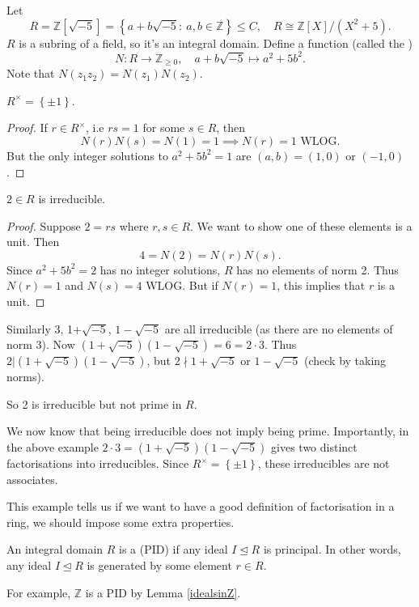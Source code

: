 \documentclass[egregdoesnotlikesansseriftitles,a4paper]{scrartcl}
\begin{document}
\begin{example}\label{Z5i not UFD}
       Let \[
            R=\mathbb{Z}[\sqrt{-5}]= \left\{a+b\sqrt{-5} : \ a,b \in \mathbb{Z}\right\} \leq C, \quad R \cong \mathbb{Z}[X]/(X^2+5)
       .\] $R$ is a subring of a field, so it's an integral domain. Define a function (called the ) \[
       N: R \rightarrow \mathbb{Z}_{\geq 0}, \quad a+b \sqrt{-5} \mapsto a^2+5b^2
       .\] Note that $N (z_1 z_2 )=N (z_1 )N (z_2 )$. 
       \begin{claim}
             $R^{\times }=\left\{\pm 1\right\}$.
       \end{claim}
       \begin{proof}
             If $r \in R^{\times }$, i.e $rs =1$ for some $s \in R$, then \[
             N (r)N (s)=N (1)=1 \implies N (r)=1 \text{ WLOG} 
             .\] But the only integer solutions to $a^2+5b^2=1$ are $(a,b)=(1,0)$ or $(-1,0)$. 
       \end{proof}
       \begin{claim}
             $2 \in R$ is irreducible.
       \end{claim}
       \begin{proof}
             Suppose $2=rs $ where $r,s \in R $. We want to show one of these elements is a unit. Then \[
             4= N (2)=N (r)N (s)
             .\] Since $a^2+5b^2=2$ has no integer solutions, $R$ has no elements of norm 2. Thus $N (r)=1$ and $N (s)=4$ WLOG. But if $N (r)=1$, this implies that $r$ is a unit. 
       \end{proof}
       Similarly 3, 1+$\sqrt{-5} $, $1- \sqrt{-5} $ are all irreducible (as there are no elements of norm 3). Now $(1+\sqrt{-5} )(1-\sqrt{-5} )=6=2 \cdot 3$. Thus $2| (1+\sqrt{-5} )(1-\sqrt{-5} )$, but $2 \nmid 1+\sqrt{-5}$ or $1- \sqrt{-5} $ (check by taking norms). 
       
       So 2 is irreducible but not prime in $R$.
\end{example}
\begin{remarks}
       We now know that being irreducible does not imply being prime. Importantly, in the above example $2 \cdot 3= (1+\sqrt{-5} )(1-\sqrt{-5} )$ gives two distinct factorisations into irreducibles. Since $R^{\times}=\left\{\pm 1\right\}$, these irreducibles are not associates.
\end{remarks}
This example tells us if we want to have a good definition of factorisation in a ring, we should impose some extra properties.
\begin{definition*}
       An integral domain $R$ is a  (PID) if any ideal $I \unlhd R$ is principal. In other words, any ideal $I \unlhd R$ is generated by some element $r \in R$.

       For example, $\mathbb{Z}$ is a PID by Lemma \ref{idealsinZ}.
\end{definition*}
\end{document}
